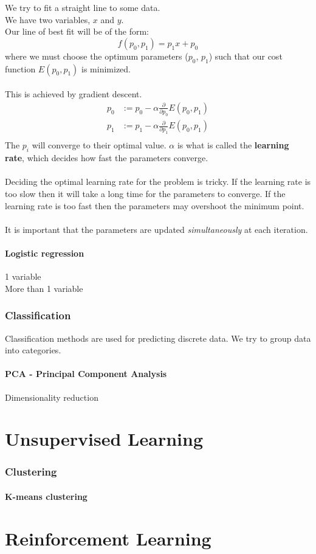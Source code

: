 \documentclass{scrartcl}
\begin{document}
We try to fit a straight line to some data.\\
We have two variables, $ x $ and $ y $.\\
Our line of best fit will be of the form:
\begin{equation}
f(p_{0}, p_{1}) = p_{1}x + p_{0}
\end{equation}
where we must choose the optimum parameters ($ p_{0} $, $ p_{1} $) such that our cost function $ E(p_{0}, p_{1}) $ is minimized.
\\\\
This is achieved by gradient descent.
\begin{align}
p_{0} & :=  p_{0} - \alpha \frac{\partial}{\partial p_{0}} E(p_{0}, p_{1}) \\
p_{1} & :=  p_{1} - \alpha \frac{\partial}{\partial p_{1}} E(p_{0}, p_{1}) \\
\end{align}
The $ p_{i} $ will converge to their optimal value. $ \alpha $ is what is called the \textbf{learning rate}, which decides how fast the parameters converge.
\\\\
Deciding the optimal learning rate for the problem is tricky. If the learning rate is too slow then it will take a long time for the parameters to converge. If the learning rate is too fast then the parameters may overshoot the minimum point.
\\\\
It is important that the parameters are updated \textit{simultaneously} at each iteration.


\subsection{Logistic regression}

1 variable\\
More than 1 variable

\section{Classification}

Classification methods are used for predicting discrete data. We try to 
group data into categories.

\subsection{PCA - Principal Component Analysis}

Dimensionality reduction

\newpage
\part{Unsupervised Learning}

\section{Clustering}

\subsection{K-means clustering}

\newpage
\part{Reinforcement Learning}
\end{document}
